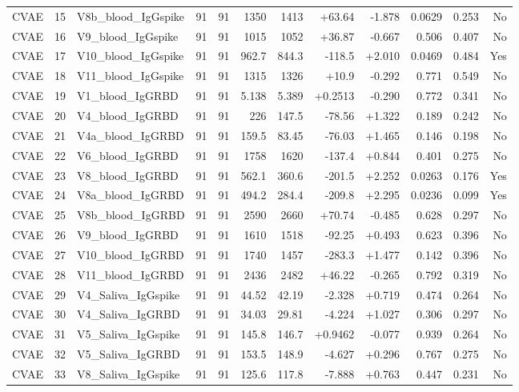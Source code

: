 \begin{landscape}
\begin{longtable}{@{}lrp{4.0cm}rrrrrrrrr@{}}
CVAE & 15 & V8b\_blood\_IgGspike & 91 & 91 & 1350 & 1413 & +63.64 & -1.878 & 0.0629 & 0.253 & No \\
CVAE & 16 & V9\_blood\_IgGspike & 91 & 91 & 1015 & 1052 & +36.87 & -0.667 & 0.506 & 0.407 & No \\
CVAE & 17 & V10\_blood\_IgGspike & 91 & 91 & 962.7 & 844.3 & -118.5 & +2.010 & 0.0469 & 0.484 & Yes \\
CVAE & 18 & V11\_blood\_IgGspike & 91 & 91 & 1315 & 1326 & +10.9 & -0.292 & 0.771 & 0.549 & No \\
CVAE & 19 & V1\_blood\_IgGRBD & 91 & 91 & 5.138 & 5.389 & +0.2513 & -0.290 & 0.772 & 0.341 & No \\
CVAE & 20 & V4\_blood\_IgGRBD & 91 & 91 & 226 & 147.5 & -78.56 & +1.322 & 0.189 & 0.242 & No \\
CVAE & 21 & V4a\_blood\_IgGRBD & 91 & 91 & 159.5 & 83.45 & -76.03 & +1.465 & 0.146 & 0.198 & No \\
CVAE & 22 & V6\_blood\_IgGRBD & 91 & 91 & 1758 & 1620 & -137.4 & +0.844 & 0.401 & 0.275 & No \\
CVAE & 23 & V8\_blood\_IgGRBD & 91 & 91 & 562.1 & 360.6 & -201.5 & +2.252 & 0.0263 & 0.176 & Yes \\
CVAE & 24 & V8a\_blood\_IgGRBD & 91 & 91 & 494.2 & 284.4 & -209.8 & +2.295 & 0.0236 & 0.099 & Yes \\
CVAE & 25 & V8b\_blood\_IgGRBD & 91 & 91 & 2590 & 2660 & +70.74 & -0.485 & 0.628 & 0.297 & No \\
CVAE & 26 & V9\_blood\_IgGRBD & 91 & 91 & 1610 & 1518 & -92.25 & +0.493 & 0.623 & 0.396 & No \\
CVAE & 27 & V10\_blood\_IgGRBD & 91 & 91 & 1740 & 1457 & -283.3 & +1.477 & 0.142 & 0.396 & No \\
CVAE & 28 & V11\_blood\_IgGRBD & 91 & 91 & 2436 & 2482 & +46.22 & -0.265 & 0.792 & 0.319 & No \\
CVAE & 29 & V4\_Saliva\_IgGspike & 91 & 91 & 44.52 & 42.19 & -2.328 & +0.719 & 0.474 & 0.264 & No \\
CVAE & 30 & V4\_Saliva\_IgGRBD & 91 & 91 & 34.03 & 29.81 & -4.224 & +1.027 & 0.306 & 0.297 & No \\
CVAE & 31 & V5\_Saliva\_IgGspike & 91 & 91 & 145.8 & 146.7 & +0.9462 & -0.077 & 0.939 & 0.264 & No \\
CVAE & 32 & V5\_Saliva\_IgGRBD & 91 & 91 & 153.5 & 148.9 & -4.627 & +0.296 & 0.767 & 0.275 & No \\
CVAE & 33 & V8\_Saliva\_IgGspike & 91 & 91 & 125.6 & 117.8 & -7.888 & +0.763 & 0.447 & 0.231 & No \\

\end{longtable}
\end{landscape}
